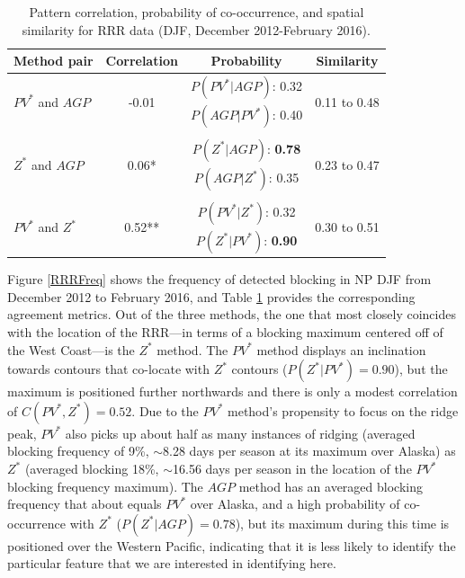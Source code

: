 \documentclass[smallextended]{svjour3}       %
\numberwithin{equation}{section}
\begin{document}
\begin{table}
\caption{Pattern correlation, probability of co-occurrence, and spatial similarity for RRR data (DJF, December 2012-February 2016). }\label{RRRtable}
\centering
\begin{tabular}{|l|ccc|}
\hline
Method pair & Correlation & Probability & Similarity \\
\hline
\multirow{2}{*}{$PV^*$ and $AGP$} & \multirow{2}{*}{-0.01} & $P(PV^*|AGP)$: 0.32 & \multirow{2}{*}{0.11 to 0.48} \\
& & $P(AGP | PV^*)$: {0.40 }& \\
& & & \\
\multirow{2}{*}{$Z^*$ and $AGP$} & \multirow{2}{*}{0.06*} & $P(Z^*|AGP)$: \textbf{0.78} & \multirow{2}{*}{0.23 to 0.47} \\
& & $P(AGP | Z^*)$: {0.35} & \\
& & & \\
\multirow{2}{*}{$PV^*$ and $Z^*$} & \multirow{2}{*}{0.52**} & $P(PV^*|Z^*)$: 0.32 & \multirow{2}{*}{0.30 to 0.51} \\
& & $P(Z^* | PV^*)$: \textbf{0.90} &  \\
\hline
\end{tabular}
\end{table}



Figure \ref{RRRFreq} shows the frequency of detected blocking in NP DJF from December 2012 to February 2016, and Table \ref{RRRtable} provides the corresponding agreement metrics. Out of the three methods, the one that most closely coincides with the location of the RRR---in terms of a blocking maximum centered off of the West Coast---is the $Z^*$ method. The $PV^*$ method displays an inclination towards contours that co-locate with $Z^*$ contours ($P(Z^*|PV^*)=0.90$), but the maximum is positioned further northwards and there is only a modest correlation of $C(PV^*, Z^*)=0.52$. Due to the $PV^*$ method's propensity to focus on the ridge peak, $PV^*$ also picks up about half as many instances of ridging (averaged blocking frequency of 9\%, $\sim$8.28 days per season at its maximum over Alaska) as $Z^*$ (averaged blocking 18\%, $\sim$16.56 days per season in the location of the $PV^*$ blocking frequency maximum). The $AGP$ method has an averaged blocking frequency that about equals $PV^*$ over Alaska, and a high probability of co-occurrence with $Z^*$ ($P(Z^*|AGP)=0.78$), but its maximum during this time is positioned over the Western Pacific, indicating that it is less likely to identify the particular feature that we are interested in identifying here. 
\end{document}
